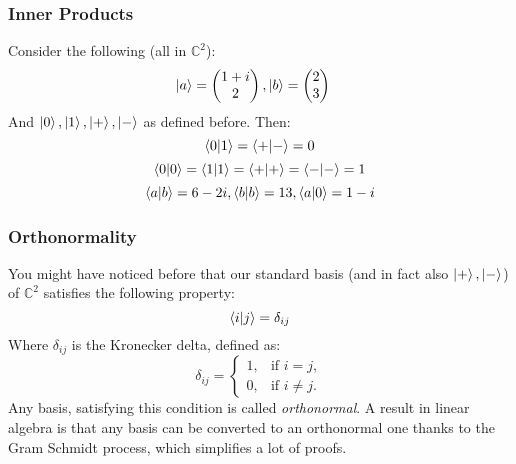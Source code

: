 \documentclass{beamer}
\begin{document}
\begin{frame}
    \frametitle{Inner Products}
    \begin{example}
        Consider the following (all in $\mathbb{C}^2$):
        \begin{align}
            \ket{a} & = \begin{pmatrix}
                1 + i \\
                2
            \end{pmatrix},
            \ket{b} = \begin{pmatrix}
                2 \\
                3
            \end{pmatrix}
        \end{align}
        And $\ket{0}, \ket{1}, \ket{+}, \ket{-}$ as defined before.
        Then:
        \begin{equation} \braket{0|1} = \braket{+| -} = 0 \end{equation}
        \begin{equation} \braket{0|0} = \braket{1|1} =  \braket{+| +} = \braket{-| -} = 1 \end{equation}
        \begin{equation}
            \braket{a|b} = 6 - 2i, \braket{b|b} = 13, \braket{a|0} = 1-i
        \end{equation}
    \end{example}

\end{frame}
\begin{frame}
    \frametitle{Orthonormality}
    You might have noticed before that our standard basis (and in fact also $\ket{+}, \ket{-}$) of $\mathbb{C}^2$ satisfies the following property:
    \begin{equation}
        \braket{i|j} = \delta_{ij}
    \end{equation}
    Where $\delta_{ij}$ is the Kronecker delta, defined as:
    \begin{equation}
        \delta_{ij} =
        \begin{cases}
            1, & \text{if } i=j,     \\
            0, & \text{if } i\neq j.
        \end{cases}
    \end{equation}
    Any basis, satisfying this condition is called \textit{orthonormal}.
    A result in linear algebra is that any basis can be converted to an orthonormal one thanks to the Gram Schmidt process, which simplifies a lot of proofs.
\end{frame}
\end{document}
